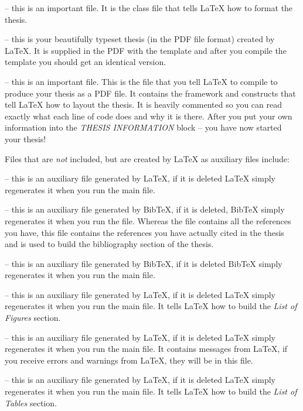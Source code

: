  -- this is an important file. It is the class file that tells \LaTeX{} how to format the thesis.

 -- this is your beautifully typeset thesis (in the PDF file format) created by \LaTeX{}. It is supplied in the PDF with the template and after you compile the template you should get an identical version.

 -- this is an important file. This is the file that you tell \LaTeX{} to compile to produce your thesis as a PDF file. It contains the framework and constructs that tell \LaTeX{} how to layout the thesis. It is heavily commented so you can read exactly what each line of code does and why it is there. After you put your own information into the \emph{THESIS INFORMATION} block -- you have now started your thesis!

Files that are \emph{not} included, but are created by \LaTeX{} as auxiliary files include:

 -- this is an auxiliary file generated by \LaTeX{}, if it is deleted \LaTeX{} simply regenerates it when you run the main  file.

 -- this is an auxiliary file generated by BibTeX, if it is deleted, BibTeX simply regenerates it when you run the  file. Whereas the  file contains all the references you have, this  file contains the references you have actually cited in the thesis and is used to build the bibliography section of the thesis.

 -- this is an auxiliary file generated by BibTeX, if it is deleted BibTeX simply regenerates it when you run the main  file.

 -- this is an auxiliary file generated by \LaTeX{}, if it is deleted \LaTeX{} simply regenerates it when you run the main  file. It tells \LaTeX{} how to build the \emph{List of Figures} section.

 -- this is an auxiliary file generated by \LaTeX{}, if it is deleted \LaTeX{} simply regenerates it when you run the main  file. It contains messages from \LaTeX{}, if you receive errors and warnings from \LaTeX{}, they will be in this  file.

 -- this is an auxiliary file generated by \LaTeX{}, if it is deleted \LaTeX{} simply regenerates it when you run the main  file. It tells \LaTeX{} how to build the \emph{List of Tables} section.

